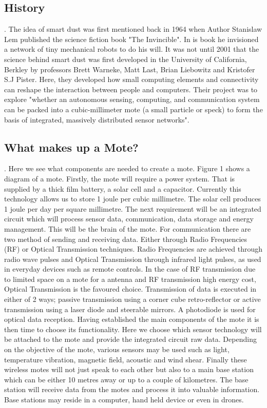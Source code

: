 \documentclass[article]{IEEEtran}
\begin{document}
\subsection*{History}.\newline
The idea of smart dust was first mentioned back in 1964 when Author Stanislaw Lem published the science fiction book "The Invincible". In is book he invisioned a network of tiny mechanical robots to do his will\cite{leminvincible}. It was not until 2001 that the science behind smart dust was first developed in the University of California, Berkley by professors Brett Warneke, Matt Last, Brian Liebowitz and Kristofer S.J Pister. 
Here, they developed how small computing elements and connectivity can reshape the interaction between people and computers. Their project was to explore "whether an autonomous sensing, computing, and communication system can be packed into a cubic-millimeter mote (a small particle or speck) to form the basis of integrated, massively distributed sensor networks"\cite{Mili}. 

\subsection*{What makes up a Mote?}.\newline
Here we see what components are needed to create a mote. 
Figure 1 shows a diagram of a mote. Firstly, the mote will require a power system. That is supplied by a thick film battery, a solar cell and a capacitor. Currently this technology allows us to store 1 joule per cubic millimetre. The solar cell produces 1 joule per day per square millimetre. 
The next requirement will be an integrated circuit which will process sensor data, communication, data storage and energy management. This will be the brain of the mote. 
For communication there are two method of sending and receiving data. Either through Radio Frequencies (RF) or Optical Transmission techniques. Radio Frequencies are achieved through radio wave pulses and Optical Transmission through infrared light pulses, as used in everyday devices such as remote controls. In the case of RF transmission due to limited space on a mote for a antenna and RF transmission high energy cost, Optical Transmission is the favoured choice. Transmission of data is executed in either of 2 ways; passive transmission using a corner cube retro-reflector or active transmission using a laser diode and steerable mirrors. A photodiode is used for optical data reception.
Having established the main components of the mote it is then time to choose its functionality. Here we choose which sensor technology will be attached to the mote and provide the integrated circuit raw data. Depending on the objective of the mote, various sensors may be used such as light, temperature vibration, magnetic field, acoustic and wind shear.
Finally these wireless motes will not just speak to each other but also to a main base station which can be either 10 metres away or up to a couple of kilometres.  The base station will receive data from the motes and process it into valuable information. Base stations may reside in a computer, hand held device or even in drones\cite{Mili}.
\end{document}
